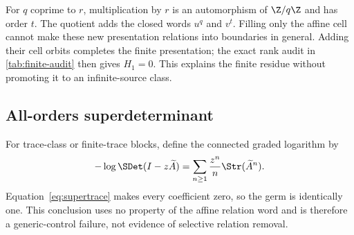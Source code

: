 For $q$ coprime to $r$, multiplication by $r$ is an automorphism of
$\Z/q\Z$ and has order $t$.  The quotient adds the closed words $u^q$ and
$v^t$.  Filling only the affine cell cannot make these new presentation
relations into boundaries in general.  Adding their cell orbits completes the
finite presentation; the exact rank audit in \cref{tab:finite-audit} then
gives $H_1=0$.  This explains the finite residue without promoting it to an
infinite-source class.

\subsection{All-orders superdeterminant}

For trace-class or finite-trace blocks, define the connected graded logarithm
by
\[
-\log\SDet(I-z\widetilde A)
=\sum_{n\ge1}\frac{z^n}{n}\Str(\widetilde A^n).
\]
Equation~\eqref{eq:supertrace} makes every coefficient zero, so the germ is
identically one.  This conclusion uses no property of the affine relation
word and is therefore a generic-control failure, not evidence of selective
relation removal.
